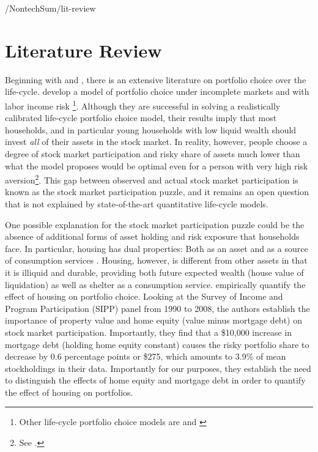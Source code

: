 \documentclass[PortfolioChoiceWithRiskyHousing]{subfiles}
\begin{document}
\begin{verbatimwrite}{\LaTeXOutput/NontechSum/lit-review}

  \section{Literature Review}

  Beginning with \cite{Merton1969} and \cite{Samuelson1969}, there is an extensive literature on portfolio choice over the life-cycle. \cite{Cocco2005} develop a model of portfolio choice under incomplete markets and with labor income risk \footnote{Other life-cycle portfolio choice models are \cite{gomes2005optimal} and \cite{yao2005optimal}}. Although they are successful in solving a realistically calibrated life-cycle portfolio choice model, their results imply that most households, and in particular young households with low liquid wealth should invest \textit{all} of their assets in the stock market. In reality, however, people choose a degree of stock market participation and risky share of assets much lower than what the model proposes would be optimal even for a person with very high risk aversion\footnote{See \cite{Carroll2020}.}. This gap between observed and actual stock market participation is known as the stock market participation puzzle, and it remains an open question that is not explained by state-of-the-art quantitative life-cycle models.

  One possible explanation for the stock market participation puzzle could be the absence of additional forms of asset holding and risk exposure that households face. In particular, housing has dual properties: Both as an asset and as a source of consumption services . Housing, however, is different from other assets in that it is illiquid and durable, providing both future expected wealth (house value of liquidation) as well as shelter as a consumption service. \cite{Chetty2017} empirically quantify the effect of housing on portfolio choice. Looking at the Survey of Income and Program Participation (SIPP) panel from 1990 to 2008, the authors establish the importance of property value and home equity (value minus mortgage debt) on stock market participation. Importantly, they find that a \$10,000 increase in mortgage debt (holding home equity constant) causes the risky portfolio share to decrease by 0.6 percentage points or \$275, which amounts to 3.9\% of mean stockholdings in their data. Importantly for our purposes, they establish the need to distinguish the effects of home equity and mortgage debt in order to quantify the effect of housing on portfolios.


\end{verbatimwrite}
\end{document}
